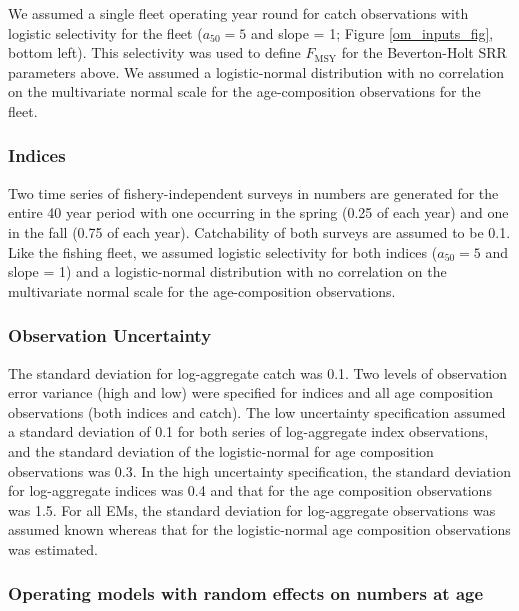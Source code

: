 \documentclass[
  12pt,
]{article}
\newcommand{\Fmsy}{\ensuremath{F_{\text{MSY}}}\xspace}
\begin{document}
We assumed a single fleet operating year round for catch observations
with logistic selectivity for the fleet (\(a_{50} = 5\) and slope = 1;
Figure \ref{om_inputs_fig}, bottom left). This selectivity was used to
define \Fmsy for the Beverton-Holt SRR parameters above. We assumed a
logistic-normal distribution with no correlation on the multivariate
normal scale for the age-composition observations for the fleet.

\subsubsection*{Indices}\label{indices}

Two time series of fishery-independent surveys in numbers are generated
for the entire 40 year period with one occurring in the spring (0.25 of
each year) and one in the fall (0.75 of each year). Catchability of both
surveys are assumed to be 0.1. Like the fishing fleet, we assumed
logistic selectivity for both indices (\(a_{50} = 5\) and slope = 1) and
a logistic-normal distribution with no correlation on the multivariate
normal scale for the age-composition observations.

\subsubsection*{Observation Uncertainty}\label{observation-uncertainty}

The standard deviation for log-aggregate catch was 0.1. Two levels of
observation error variance (high and low) were specified for indices and
all age composition observations (both indices and catch). The low
uncertainty specification assumed a standard deviation of 0.1 for both
series of log-aggregate index observations, and the standard deviation
of the logistic-normal for age composition observations was 0.3. In the
high uncertainty specification, the standard deviation for log-aggregate
indices was 0.4 and that for the age composition observations was 1.5.
For all EMs, the standard deviation for log-aggregate observations was
assumed known whereas that for the logistic-normal age composition
observations was estimated.

\subsubsection*{Operating models with random effects on numbers at
age}\label{operating-models-with-random-effects-on-numbers-at-age}
\end{document}
